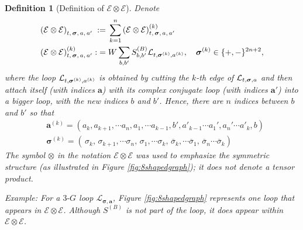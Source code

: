 \documentclass[10pt,reqno]{article}
\theoremstyle{plain} %
\newtheorem{definition}[theorem]{Definition}
\theoremstyle{remark}
\numberwithin{equation}{section}
\begin{document}
 
\begin{definition}[Definition of $\mathcal{E}\otimes  \mathcal{E}$]\label{def:CALE} 
Denote 
  \begin{align}\label{defEOTE}
 \left( \mathcal{E}\otimes  \mathcal{E} \right)_{t, \,\boldsymbol{\sigma}, \,\textbf{a}, \,\textbf{a}'} \; := \; &
 \sum_{k=1}^n\left( \mathcal{E}\otimes  \mathcal{E} \right)^{(k)}_{t, \,\boldsymbol{\sigma}, \,\textbf{a}, \,\textbf{a}'}
 \nonumber \\
 \left( \mathcal{E}\otimes  \mathcal{E} \right)^{(k)}_{t, \,\boldsymbol{\sigma}, \,\textbf{a}, \,\textbf{a}'} :
\; = \; & W \sum_{b,b'} S^{(B)}_{b,b'}{\cal L}_{t, \boldsymbol{\sigma}^{(k ) },\textbf{a}^{(k )}},\quad \boldsymbol{\sigma}^{(k ) }\in \{+,-\}^{2n+2}, 
\end{align}
where the loop ${\cal L}_{t, \boldsymbol{\sigma}^{(k ) },\textbf{a}^{(k )}}$ is obtained by cutting the $k$-th edge of ${\cal L}_{t,\boldsymbol{\sigma},\textbf{a}}$ and then attach itself (with indices $\textbf{a}$) with its complex conjugate loop (with indices $\textbf{a}'$)  into a bigger loop, with the new indices $b$ and $b'$. Hence, there are $n$ indices between $b$ and $b'$ so that 
\begin{align}\label{def_diffakn_k}
   & \textbf{a}^{(k )}=( a_k,a_{k+1},\cdots a_n, a_1,\cdots a_{k-1}, b', a'_{k-1}\cdots a_1', a_n'\cdots a'_{k},b)
    \nonumber \\
  &  \boldsymbol{\sigma}^{(k )}=( \, \sigma_k, \, \sigma_{k+1},\cdots \sigma_n,  \, \sigma_1,\cdots \sigma_{k}, \,  \overline\sigma_{k},  \cdots \overline\sigma_1 , \,  \overline\sigma_n \cdots \overline\sigma_{k })
\end{align}
The symbol $\otimes$ in the notation $\mathcal{E} \otimes \mathcal{E}$ was used  to emphasize the symmetric structure (as illustrated in Figure \eqref{fig:8shapedgraph}); it  does not denote a tensor product.  

Example: For a $3\text{-}G$ loop $\mathcal{L}_{\boldsymbol{\sigma}, \mathbf{a}}$, Figure \ref{fig:8shapedgraph} represents one loop that appears in $\mathcal{E} \otimes \mathcal{E}$. Although $S^{(B)}$ is not part of the loop, it does appear within $\mathcal{E} \otimes \mathcal{E}$.

 
\begin{figure}[ht]
\centering
\begin{minipage}{0.45\textwidth} %
    \centering
    \begin{tikzpicture}[scale=1.0]


\end{tikzpicture}
\end{minipage}
\end{figure}
\end{definition}
\end{document}
